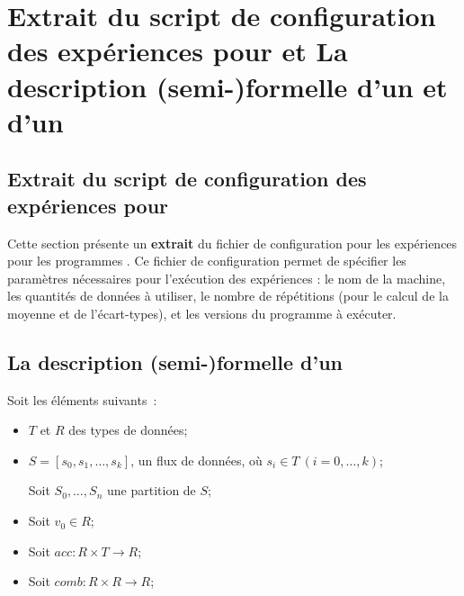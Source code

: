 \chapter{Extrait du script de configuration des expériences pour  et La description (semi-)formelle d'un  et d'un }

\section{Extrait du script de configuration des expériences pour }
\label{ExperiencesPreliminairesWordCount.ann}

Cette section pr\'esente un \textbf{extrait} du fichier de
configuration pour les expériences pour les programmes
. Ce fichier de configuration permet de sp\'ecifier les
param\`etres nécessaires pour l'ex\'ecution des exp\'eriences : le nom
de la machine, les quantit\'es de donn\'ees à utiliser, le nombre de
r\'ep\'etitions (pour le calcul de la moyenne et de l'écart-types), et
les versions du programme \`a ex\'ecuter.


\pagebreak




\section{La description (semi-)formelle d'un }
\label{DescriptionFormelleReducer.ann}


Soit les \'el\'ements suivants~: 

\begin{itemize}

\item $T$ et $R$ des types de donn\'ees;

\item $S = [s_0, s_1, \ldots, s_k]$, un flux de donn\'ees, o\`u $s_i
\in T~(i=0, \ldots, k)$;

Soit $S_0, \ldots, S_n$ une partition de $S$;

\item Soit $v_0\in R$;

\item Soit $acc: R\times T \rightarrow R$;

\item Soit $comb: R\times R \rightarrow R$;


\end{itemize}

